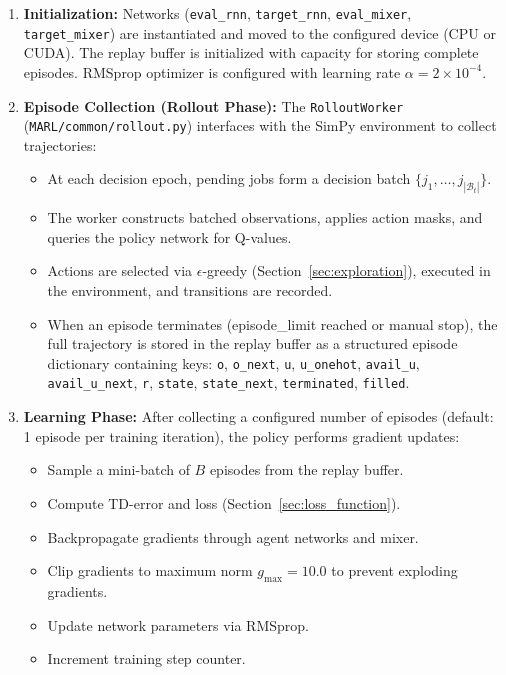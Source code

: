 \begin{enumerate}
\item \textbf{Initialization:} Networks (\texttt{eval\_rnn}, \texttt{target\_rnn}, \texttt{eval\_mixer}, \texttt{target\_mixer}) are instantiated and moved to the configured device (CPU or CUDA). The replay buffer is initialized with capacity for storing complete episodes. RMSprop optimizer is configured with learning rate \(\alpha = 2 \times 10^{-4}\).

\item \textbf{Episode Collection (Rollout Phase):} The \texttt{RolloutWorker} (\texttt{MARL/common/rollout.py}) interfaces with the SimPy environment to collect trajectories:
\begin{itemize}
    \item At each decision epoch, pending jobs form a decision batch \(\{j_1, \ldots, j_{|\mathcal{B}_t|}\}\).
    \item The worker constructs batched observations, applies action masks, and queries the policy network for Q-values.
    \item Actions are selected via \(\epsilon\)-greedy (Section~\ref{sec:exploration}), executed in the environment, and transitions are recorded.
    \item When an episode terminates (episode\_limit reached or manual stop), the full trajectory is stored in the replay buffer as a structured episode dictionary containing keys: \texttt{o}, \texttt{o\_next}, \texttt{u}, \texttt{u\_onehot}, \texttt{avail\_u}, \texttt{avail\_u\_next}, \texttt{r}, \texttt{state}, \texttt{state\_next}, \texttt{terminated}, \texttt{filled}.
\end{itemize}

\item \textbf{Learning Phase:} After collecting a configured number of episodes (default: 1 episode per training iteration), the policy performs gradient updates:
\begin{itemize}
    \item Sample a mini-batch of \(B\) episodes from the replay buffer.
    \item Compute TD-error and loss (Section~\ref{sec:loss_function}).
    \item Backpropagate gradients through agent networks and mixer.
    \item Clip gradients to maximum norm \(g_{\max} = 10.0\) to prevent exploding gradients.
    \item Update network parameters via RMSprop.
    \item Increment training step counter.
\end{itemize}


\end{enumerate}
